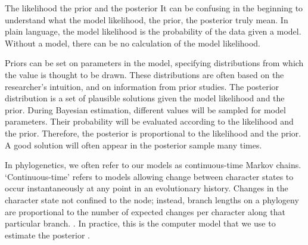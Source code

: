 \begin{boxedtext}{The likelihood the prior and the posterior} 
It can be confusing in the beginning to understand what the model likelihood, the prior,  the posterior truly mean.
In plain language, the model likelihood is the probability of the data given a model.
Without a model, there can be no calculation of the model  likelihood.

Priors can be set on parameters in the model, specifying distributions from which the value is thought to be drawn.
These distributions are often based on the researcher's intuition, and on information from prior studies.
The posterior distribution is a set of plausible solutions given the model likelihood and the prior.
During Bayesian estimation, different values will be sampled for model parameters.
Their probability will be evaluated according to the likelihood and the prior.
Therefore, the posterior is proportional to the likelihood and the prior.
A good solution will often appear in the posterior sample many times.

In phylogenetics, we often refer to our models as continuous-time Markov chains.
`Continuous-time' refers to models allowing change between character states to occur instantaneously at any point in an evolutionary history.
Changes in the character state  not confined to the node; instead, branch lengths on a phylogeny are proportional to the number of expected changes per character along that particular branch. 
.
In practice, this is the computer model that we use to estimate the posterior \citep{Hoehna2016b}.
\end{boxedtext}

